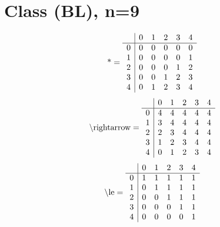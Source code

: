 \documentclass[11pt]{article}
\begin{document}
\section{Class (BL), n=9}
\[\text{*} = 
\begin{array}{r | r r r r r}
 & 0 & 1 & 2 & 3 & 4 \\ \hline
0 & 0 & 0 & 0 & 0 & 0 \\
1 & 0 & 0 & 0 & 0 & 1 \\
2 & 0 & 0 & 0 & 1 & 2 \\
3 & 0 & 0 & 1 & 2 & 3 \\
4 & 0 & 1 & 2 & 3 & 4 \\
\end{array}
\]
\[\text{\textbackslash rightarrow} = 
\begin{array}{r | r r r r r}
 & 0 & 1 & 2 & 3 & 4 \\ \hline
0 & 4 & 4 & 4 & 4 & 4 \\
1 & 3 & 4 & 4 & 4 & 4 \\
2 & 2 & 3 & 4 & 4 & 4 \\
3 & 1 & 2 & 3 & 4 & 4 \\
4 & 0 & 1 & 2 & 3 & 4 \\
\end{array}
\]
\[\text{\textbackslash le} = 
\begin{array}{r | r r r r r}
 & 0 & 1 & 2 & 3 & 4 \\ \hline
0 & 1 & 1 & 1 & 1 & 1 \\
1 & 0 & 1 & 1 & 1 & 1 \\
2 & 0 & 0 & 1 & 1 & 1 \\
3 & 0 & 0 & 0 & 1 & 1 \\
4 & 0 & 0 & 0 & 0 & 1 \\
\end{array}
\]
\end{document}
